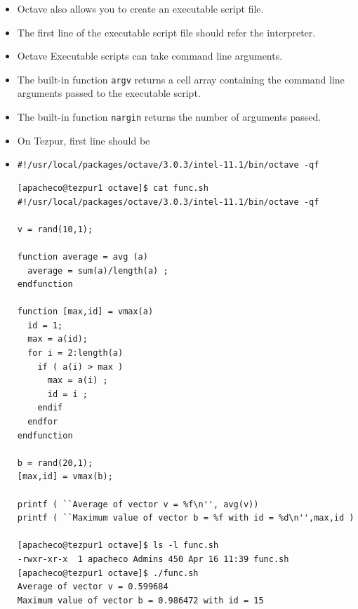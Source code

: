 \documentclass[slidestop,mathserif,compress,xcolor=svgnames]{beamer}
\begin{document}
\begin{frame}
\begin{itemize}
{\begin{verbatim}
[apacheco@tezpur1 octave]$ octave -q
octave:1> source('func.txt')
Average of vector v = 0.487381
Maximum value of vector b = 0.878363 with id = 14
      \end{verbatim}
    }
    \item Octave also allows you to create an executable script file.
    \item The first line of the executable script file should refer the interpreter.
    \item Octave Executable scripts can take command line arguments.
    \item The built-in function \texttt{argv} returns a cell array containing the command line arguments passed to the executable script.
    \item The built-in function \texttt{nargin} returns the number of arguments passed.
    \item On Tezpur, first line should be
    \item[]{\tiny\texttt{\#!/usr/local/packages/octave/3.0.3/intel-11.1/bin/octave -qf}}
    {\tiny
      \begin{verbatim}
[apacheco@tezpur1 octave]$ cat func.sh 
#!/usr/local/packages/octave/3.0.3/intel-11.1/bin/octave -qf

v = rand(10,1);

function average = avg (a)
  average = sum(a)/length(a) ;
endfunction

function [max,id] = vmax(a)
  id = 1;
  max = a(id);
  for i = 2:length(a)
    if ( a(i) > max )
      max = a(i) ;
      id = i ;
    endif
  endfor
endfunction

b = rand(20,1);
[max,id] = vmax(b); 

printf ( ``Average of vector v = %f\n'', avg(v)) 
printf ( ``Maximum value of vector b = %f with id = %d\n'',max,id )

[apacheco@tezpur1 octave]$ ls -l func.sh 
-rwxr-xr-x  1 apacheco Admins 450 Apr 16 11:39 func.sh
[apacheco@tezpur1 octave]$ ./func.sh 
Average of vector v = 0.599684
Maximum value of vector b = 0.986472 with id = 15
      \end{verbatim}
    }
  \end{itemize}
\end{frame}
\end{document}
